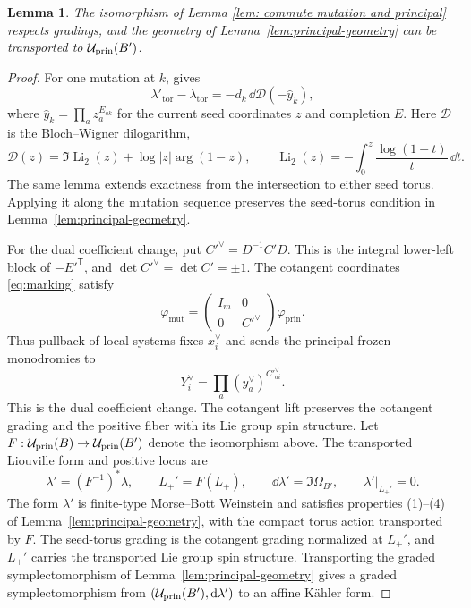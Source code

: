 \documentclass[12pt, letter]{amsart}
\newtheorem{lemma}[theorem]{Lemma}
\theoremstyle{definition}
\newcommand{\pr}{\mathrm{prin}}
\numberwithin{equation}{section}
\begin{document}
\begin{lemma}\label{lem:reseeding}
The isomorphism of Lemma \ref{lem: commute mutation and principal} respects gradings, and the geometry of Lemma~\ref{lem:principal-geometry}
can be transported to $\cU_{\pr}(B')$.
\end{lemma}
\begin{proof}
For one mutation at $k$, \cite[Lemma~4.13]{HS} gives
\[
 \lambda'_{\mathrm{tor}}-\lambda_{\mathrm{tor}}
 =-d_k\,\dd\mathcal D(-\widehat y_k),
\]
where $\widehat y_k=\prod_a z_a^{E_{ak}}$ for the current seed
coordinates $z$ and completion $E$.
Here $\mathcal D$ is the Bloch--Wigner dilogarithm,
\[
 \mathcal D(z)=\Im\operatorname{Li}_2(z)
       +\log|z|\arg(1-z),\qquad
 \operatorname{Li}_2(z)=-\int_0^z\frac{\log(1-t)}{t}\,\dd t.
\]
The same lemma extends exactness from the intersection to either
seed torus. Applying it along the mutation sequence preserves the
seed-torus condition in Lemma~\ref{lem:principal-geometry}.

For the dual coefficient change, put
$C'^\vee=D^{-1}C'D$. This is the integral lower-left block of
$-E'^{\mathsf T}$, and $\det C'^\vee=\det C'=\pm1$.
The cotangent coordinates \eqref{eq:marking} satisfy
\[
 \varphi_{\mathrm{mut}}
 =\begin{pmatrix}I_m&0\\0&C'^\vee\end{pmatrix}
       \varphi_{\mathrm{prin}}.
\]
Thus pullback of local systems fixes $x_i^\vee$ and sends the
principal frozen monodromies to
\[
 Y_i^\vee=\prod_a(y_a^\vee)^{C'^\vee_{ai}}.
\]
This is the dual coefficient change. The cotangent lift preserves
the cotangent grading and the positive fiber with its Lie group
spin structure.
Let $F:\cU_{\pr}(B)\to\cU_{\pr}(B')$ denote the isomorphism above.
The transported Liouville form and positive locus are
\[
 \lambda'=(F^{-1})^*\lambda,\qquad L_+'=F(L_+),\qquad
 \dd\lambda'=\Im\Omega_{B'},\qquad \lambda'|_{L_+'}=0.
\]
The form $\lambda'$ is finite-type Morse--Bott Weinstein and
satisfies properties (1)--(4) of Lemma~\ref{lem:principal-geometry},
with the compact torus action transported by $F$.
The seed-torus grading is the cotangent grading normalized at $L_+'$,
and $L_+'$ carries the transported Lie group spin structure.
Transporting the graded symplectomorphism of
Lemma~\ref{lem:principal-geometry} gives a graded symplectomorphism
from $(\cU_{\pr}(B'),\dd\lambda')$ to an affine K\"ahler form.
\end{proof}
\end{document}
